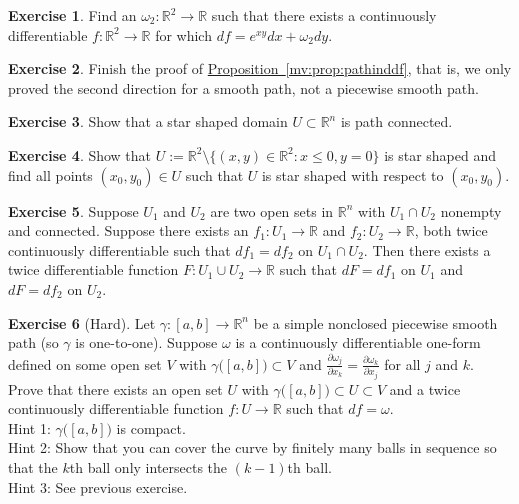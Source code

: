 \documentclass[12pt]{book}
\newcommand{\R}{{\mathbb{R}}}
\theoremstyle{plain}
\theoremstyle{remark}
\theoremstyle{definition}
\theoremstyle{exercise}
\newtheorem{exercise}{Exercise}[section]
\theoremstyle{example}
\newcommand{\propref}[1]{\hyperref[#1]{Proposition~\ref*{#1}}}
\begin{document}
\begin{exercise}
Find an $\omega_2 \colon \R^2 \to \R$ such that
there exists a continuously differentiable $f \colon \R^2 \to \R$
for which
$df = e^{xy} dx + \omega_2 dy$.
\end{exercise}

\begin{exercise}
Finish the proof of \propref{mv:prop:pathinddf}, that is, we only proved the
second direction for a smooth path, not a piecewise smooth path.
\end{exercise}

\begin{exercise}
Show that a star shaped domain $U \subset \R^n$ is path connected.
\end{exercise}

\begin{exercise}
Show that $U := \R^2 \setminus \{ (x,y) \in \R^2 : x \leq 0, y=0 \}$ is
star shaped and find all points $(x_0,y_0) \in U$ such that
$U$ is star shaped with respect to $(x_0,y_0)$.
\end{exercise}

\begin{exercise}
Suppose $U_1$ and $U_2$ are two open sets in $\R^n$ with $U_1 \cap U_2$
nonempty and connected.
Suppose there exists an $f_1 \colon U_1 \to \R$ and
$f_2 \colon U_2 \to \R$, both twice continuously differentiable
such that $d f_1 = d f_2$ on $U_1 \cap U_2$.
Then there exists a twice differentiable function $F \colon U_1 \cup U_2 \to
\R$ such that $dF = df_1$ on $U_1$ and $dF = df_2$ on $U_2$.
\end{exercise}

\begin{exercise}[Hard]
Let $\gamma \colon [a,b] \to \R^n$ be a simple nonclosed piecewise smooth
path (so $\gamma$
is one-to-one).  Suppose $\omega$ is a continuously differentiable
one-form defined on some open
set $V$ with $\gamma\bigl([a,b]\bigr) \subset V$ and
$\frac{\partial \omega_j}{\partial x_k} = \frac{\partial \omega_k}{\partial
x_j}$
for all $j$ and $k$.  Prove that there exists an open set $U$
with $\gamma\bigl([a,b]\bigr) \subset U \subset V$ and
a twice continuously differentiable function $f \colon U \to \R$
such that $df = \omega$.
\\
Hint 1: $\gamma\bigl([a,b]\bigr)$ is compact.\\
Hint 2: Show that you can cover the curve by finitely many balls in sequence
so that the $k$th ball only intersects the $(k-1)$th ball.\\
Hint 3: See previous exercise.
\end{exercise}
\end{document}
